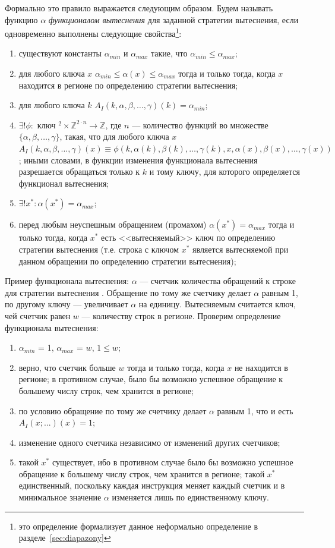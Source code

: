 Формально это правило выражается следующим образом. Будем называть функцию
$\alpha$ \emph{функционалом вытеснения} для заданной стратегии вытеснения, если
одновременно выполнены следующие свойства\footnote{это определение формализует данное неформально определение в разделе~\ref{sec:diapazony}}:
\begin{enumerate}
  \item существуют константы $\alpha_{min}$ и $\alpha_{max}$ такие, что
$\alpha_{min} \leqslant \alpha_{max}$;
  \item для любого ключа $x$ $\alpha_{min} \leqslant \alpha(x) \leqslant
\alpha_{max}$ тогда и только тогда, когда $x$ находится в регионе по определению
стратегии вытеснения;
  \item для любого ключа $k$ $A_I(k, \alpha,\beta,\dots,\gamma) (k) =
\alpha_{min}$;
  \item $\exists! \phi: \mbox{~ключ~}^2 \times \mathds{Z}^{2\cdot n} \rightarrow
\mathds{Z}$, где $n$ --- количество функций во множестве
$\{\alpha,\beta,\dots,\gamma\}$, такая, что для любого ключа $x$ $A_I(k,
\alpha,\beta,\dots,\gamma)(x) \equiv \phi(k, \alpha(k), \beta(k), \dots,
\gamma(k), x, \alpha(x), \beta(x), \dots, \gamma(x))$; иными словами, в функции
изменения функционала вытеснения разрешается обращаться только к $k$ и тому ключу,
для которого определяется функционал вытеснения;
  \item $\exists! x^* : \alpha(x^*) = \alpha_{max}$;
  \item перед любым неуспешным обращением (промахом) $\alpha(x^*) =
\alpha_{max}$ тогда и только тогда, когда $x^*$ есть <<вытесняемый>> ключ по
определению стратегии вытеснения (т.е. строка с ключом $x^*$ является
вытесняемой при данном обращении по определению стратегии вытеснения);
\end{enumerate}

Пример функционала вытеснения: $\alpha$ --- счетчик количества обращений к строке
для стратегии вытеснения \LRU. Обращение по тому же счетчику делает $\alpha$
равным 1, по другому ключу --- увеличивает $\alpha$ на единицу. Вытесняемым
считается ключ, чей счетчик равен $w$ --- количеству строк в регионе. Проверим
определение функционала вытеснения:
\begin{enumerate}
    \item $\alpha_{min}$ = 1, $\alpha_{max}$ = $w$, $1 \leqslant w$;
    \item верно, что счетчик больше $w$ тогда и только тогда, когда $x$ не
находится в регионе; в противном случае, было бы возможно успешное обращение к
большему числу строк, чем хранится в регионе;
    \item по условию обращение по тому же счетчику делает $\alpha$ равным 1, что
и есть $A_I(x;...)(x) = 1$;
    \item изменение одного счетчика независимо от изменений других счетчиков;
    \item такой $x^*$ существует, ибо в противном случае было бы возможно
успешное обращение к большему числу строк, чем хранится в регионе; такой $x^*$
единственный, поскольку каждая инструкция меняет каждый счетчик и в минимальное
значение $\alpha$ изменяется лишь по единственному ключу.
\end{enumerate}


